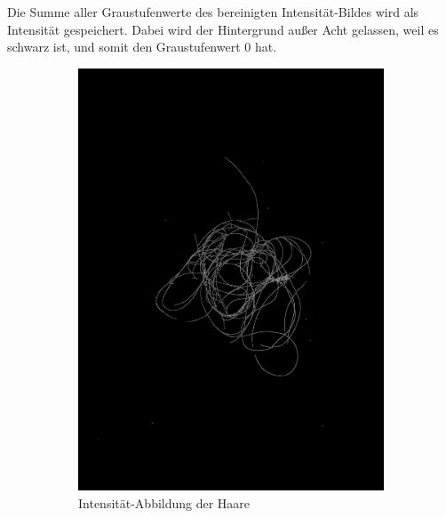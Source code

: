 \documentclass[german,a4paper, 12pt]{llncs}
\begin{document}
Die Summe aller Graustufenwerte des bereinigten Intensität-Bildes wird als Intensität gespeichert. Dabei wird der Hintergrund außer Acht gelassen, weil es schwarz ist, und somit den Graustufenwert 0 hat.
\begin{figure}
	\centering
	\begin{subfigure}[b]{0.475\textwidth}
		\centering
		\includegraphics[width=\textwidth]{fig64/05intenstiy.png}
		\caption[]{Intensität-Abbildung der Haare}
		\label{img:Intensity2}
	\end{subfigure}
	\hfill
	\begin{subfigure}[b]{0.475\textwidth} 
		\centering

\end{subfigure}
\end{figure}
\end{document}
